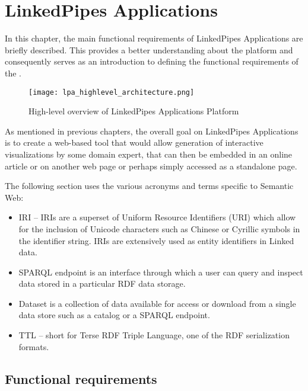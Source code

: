 \chapter{LinkedPipes Applications}
\label{chap:num_1}

In this chapter, the main functional requirements of LinkedPipes Applications are briefly described. This provides a better understanding about the platform and consequently serves as an introduction to defining the functional requirements of the \lpa{}.


\begin{figure}[h]

\centering
\texttt{[image: lpa\_highlevel\_architecture.png]}
\caption{High-level overview of LinkedPipes Applications Platform}
\label{fig:high-level-arch}
\end{figure}

As mentioned in previous chapters, the overall goal on LinkedPipes Applications is to create a web-based tool that would allow generation of interactive visualizations by some domain expert, that can then be embedded in an online article or on another web page or perhaps simply accessed as a standalone page.

The following section uses the various acronyms and terms specific to Semantic Web: 

\begin{itemize}
    \item \gls{IRI} -- IRIs are a superset of Uniform Resource Identifiers (URI) which allow for the inclusion of Unicode characters such as Chinese or Cyrillic symbols in the identifier string. IRIs are extensively used as entity identifiers in Linked data.
    \item SPARQL endpoint is an interface through which a user can query and inspect data stored in a particular RDF data storage.
    \item Dataset is a collection of data available for access or download from a single data store such as a catalog or a SPARQL endpoint.
    \item TTL -- short for Terse RDF Triple Language, one of the RDF serialization formats.
\end{itemize}

\section{Functional requirements}



